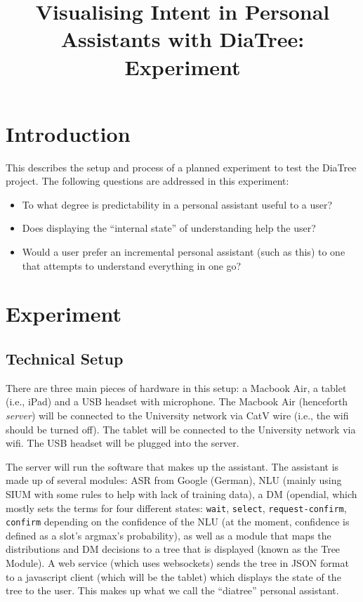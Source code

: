 \documentclass[a4paper,10pt]{article}
\title{Visualising Intent in Personal Assistants with DiaTree: Experiment}
\author{}
\begin{document}
\maketitle

\begin{abstract}

\end{abstract}

\section{Introduction}

This describes the setup and process of a planned experiment to test the DiaTree project. The following questions are addressed in this experiment:

\begin{itemize}
 \item To what degree is predictability in a personal assistant useful to a user?
 \item Does displaying the ``internal state'' of understanding help the user?
 \item Would a user prefer an incremental personal assistant (such as this) to one that attempts to understand everything in one go?
\end{itemize}


\section{Experiment}

\subsection{Technical Setup}

There are three main pieces of hardware in this setup: a Macbook Air, a tablet (i.e., iPad) and a USB headset with microphone. The Macbook Air (henceforth \emph{server}) will be connected to the University network via CatV wire (i.e., the wifi should be turned off). The tablet will be connected to the University network via wifi. The USB headset will be plugged into the server. 

The server will run the software that makes up the assistant. The assistant is made up of several modules: ASR from Google (German), NLU (mainly using SIUM with some rules to help with lack of training data), a DM (opendial, which mostly sets the terms for four different states: \texttt{wait}, \texttt{select}, \texttt{request-confirm}, \texttt{confirm} depending on the confidence of the NLU (at the moment, confidence is defined as a slot's argmax's probability), as well as a module that maps the distributions and DM decisions to a tree that is displayed (known as the Tree Module). A web service (which uses websockets) sends the tree in JSON format to a javascript client (which will be the tablet) which displays the state of the tree to the user. This makes up what we call the ``diatree'' personal assistant. 
\end{document}
